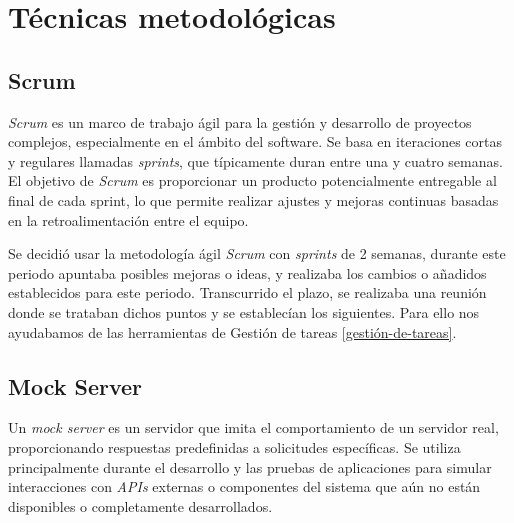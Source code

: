 
\begin{comment}
Esta parte de la memoria tiene como objetivo presentar las técnicas metodológicas y las herramientas de desarrollo que se han utilizado para llevar a cabo el proyecto. Si se han estudiado diferentes alternativas de metodologías, herramientas, bibliotecas se puede hacer un resumen de los aspectos más destacados de cada alternativa, incluyendo comparativas entre las distintas opciones y una justificación de las elecciones realizadas. 
No se pretende que este apartado se convierta en un capítulo de un libro dedicado a cada una de las alternativas, sino comentar los aspectos más destacados de cada opción, con un repaso somero a los fundamentos esenciales y referencias bibliográficas para que el lector pueda ampliar su conocimiento sobre el tema.
\end{comment}


\section{Técnicas metodológicas}

\subsection{Scrum}\label{scrum}

\textit{Scrum} es un marco de trabajo ágil para la gestión y desarrollo de proyectos complejos, especialmente en el ámbito del software. Se basa en iteraciones cortas y regulares llamadas \textit{sprints}, que típicamente duran entre una y cuatro semanas. El objetivo de \textit{Scrum} es proporcionar un producto potencialmente entregable al final de cada sprint, lo que permite realizar ajustes y mejoras continuas basadas en la retroalimentación entre el equipo. \cite{schwaber2020}

Se decidió usar la metodología ágil \textit{Scrum} con \textit{sprints} de 2 semanas, durante este periodo apuntaba posibles mejoras o ideas, y realizaba los cambios o añadidos establecidos para este periodo. Transcurrido el plazo, se realizaba una reunión donde se trataban dichos puntos y se establecían los siguientes. Para ello nos ayudabamos de las herramientas de Gestión de tareas \ref{gestión-de-tareas}.


\subsection{Mock Server}\label{mock-server}
Un \textit{mock server} es un servidor que imita el comportamiento de un servidor real, proporcionando respuestas predefinidas a solicitudes específicas. Se utiliza principalmente durante el desarrollo y las pruebas de aplicaciones para simular interacciones con \textit{APIs} externas o componentes del sistema que aún no están disponibles o completamente desarrollados.

